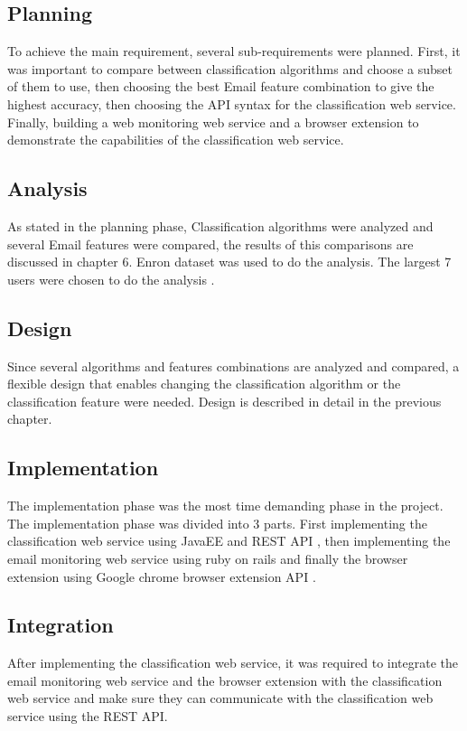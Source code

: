 \subsection{Planning}
To achieve the main requirement, several sub-requirements were planned.
First, it was important to compare between classification algorithms and choose 
a subset of them to use, then choosing the best Email feature combination to 
give the highest accuracy, then choosing the API syntax for the classification 
web service. Finally, building a web monitoring web service and a browser extension 
to demonstrate the capabilities of the classification web service.
\subsection{Analysis}
As stated in the planning phase, Classification algorithms were analyzed and 
several Email features were compared, the results of this comparisons are 
discussed in chapter 6. Enron dataset was used to do the analysis. The largest 7 
users were chosen to do the analysis \cite{RON04}.

\subsection{Design}
Since several algorithms and features combinations are analyzed and compared, 
a flexible design that enables changing the classification algorithm or the 
classification feature were needed. Design is described in detail in the previous 
chapter.

\subsection{Implementation}
The implementation phase was the most time demanding phase in the project. The 
implementation phase was divided into 3 parts. First implementing the 
classification web service using JavaEE and REST API \cite{REST},
then implementing the email monitoring web service using ruby on rails \cite{ROR}
and finally the browser extension using Google chrome browser extension API \cite{CHROME}.

\subsection{Integration}
After implementing the classification web service,
it was required to integrate the email monitoring web service and the browser extension with
the classification web service and make sure they can communicate with the classification web
service using the REST API.

